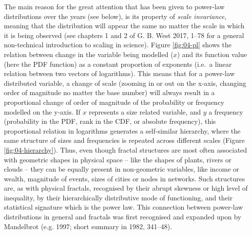 \documentclass[
  12pt,
  a4paper, twoside]{book}
\begin{document}
The main reason for the great attention that has been given to power-law distributions over the years (see below), is its property of \emph{scale invariance}, meaning that the distribution will appear the same no matter the scale in which it is being observed (see chapters 1 and 2 of G. B. West 2017, 1--78 for a general non-technical introduction to scaling in science). Figure \ref{fig:04-pl} shows the relation between change in the variable being modelled (\(x\)) and its function value (here the PDF function) as a constant proportion of exponents (i.e.~a linear relation between two vectors of logarithms). This means that for a power-law distributed variable, a change of scale (zooming in or out on the x-axis, changing order of magnitude no matter the base number) will always result in a proportional change of order of magnitude of the probability or frequency modelled on the y-axis. If \(x\) represents a size related variable, and \(y\) a frequency (probability in the PDF, rank in the CDF, or absolute frequency), this proportional relation in logarithms generates a self-similar hierarchy, where the same structure of sizes and frequencies is repeated across different scales (Figure \ref{fig:04-hierarchy}). Thus, even though fractal structures are most often associated with geometric shapes in physical space -- like the shapes of plants, rivers or clouds -- they can be equally present in non-geometric variables, like income or wealth, magnitude of events, sizes of cities or nodes in networks. Such structures are, as with physical fractals, recognised by their abrupt skewness or high level of inequality, by their hierarchically distributive mode of functioning, and their statistical signature which is the power law. This connection between power-law distributions in general and fractals was first recognised and expanded upon by Mandelbrot (e.g. 1997; short summary in 1982, 341--48).
\end{document}
